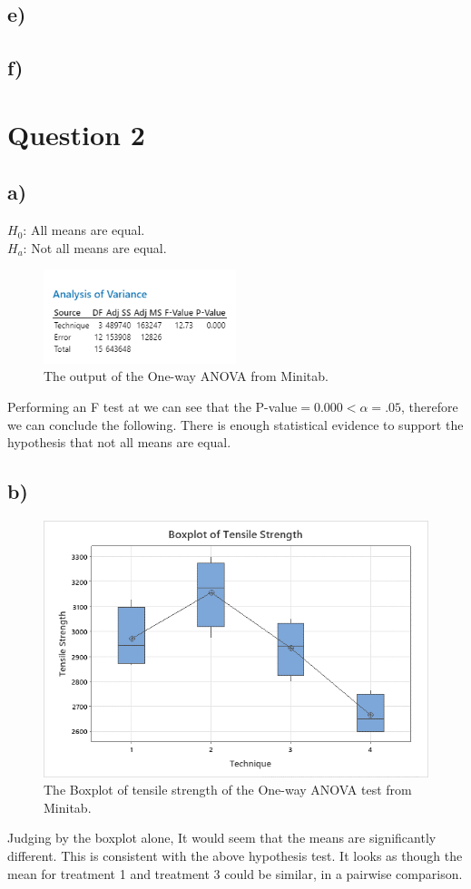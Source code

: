 \documentclass{article}
\begin{document}
\subsection*{e)}
\subsection*{f)}

\clearpage
\section*{Question 2}

\subsection*{a)}
$H_0$: All means are equal. \\
$H_a$: Not all means are equal. \\
\begin{figure}[h]
    \centering
    \includegraphics[width=0.5\textwidth]{./images/2_a.png}
    \caption{The output of the One-way ANOVA from Minitab.}
    \label{fig:2_a}
\end{figure}
Performing an F test at we can see that the P-value$ = 0.000 < \alpha = .05$, therefore we can conclude the following.
There is enough statistical evidence to support the hypothesis that not all means are equal.

\subsection*{b)}
\begin{figure}[h]
    \centering
    \includegraphics[width=1\textwidth]{./images/2_b.png}
    \caption{The Boxplot of tensile strength of the One-way ANOVA test from Minitab.}
    \label{fig:2_b}
\end{figure}
Judging by the boxplot alone, It would seem that the means are significantly different.
This is consistent with the above hypothesis test.
It looks as though the mean for treatment 1 and treatment 3 could be similar, in a pairwise comparison.
\end{document}
